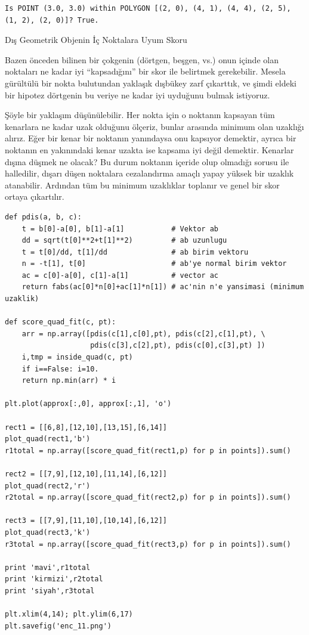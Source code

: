 \documentclass[12pt,fleqn]{article}\usepackage{../../common}
\begin{document}
\begin{verbatim}
Is POINT (3.0, 3.0) within POLYGON [(2, 0), (4, 1), (4, 4), (2, 5), (1, 2), (2, 0)]? True.
\end{verbatim}

Dış Geometrik Objenin İç Noktalara Uyum Skoru

Bazen önceden bilinen bir çokgenin (dörtgen, beşgen, vs.) onun içinde olan
noktaları ne kadar iyi ``kapsadığını'' bir skor ile belirtmek
gerekebilir. Mesela gürültülü bir nokta bulutundan yaklaşık dışbükey zarf
çıkarttık, ve şimdi eldeki bir hipotez dörtgenin bu veriye ne kadar iyi
uyduğunu bulmak istiyoruz. 

Şöyle bir yaklaşım düşünülebilir. Her nokta için o noktanın kapsayan tüm
kenarlara ne kadar uzak olduğunu ölçeriz, bunlar arasında minimum olan
uzaklığı alırız. Eğer bir kenar bir noktanın yanındaysa onu kapsıyor
demektir, ayrıca bir noktanın en yakınındaki kenar uzakta ise kapsama iyi
değil demektir. Kenarlar dışına düşmek ne olacak? Bu durum noktanın içeride
olup olmadığı sorusu ile halledilir, dışarı düşen noktalara cezalandırma
amaçlı yapay yüksek bir uzaklık atanabilir. Ardından tüm bu minimum
uzaklıklar toplanır ve genel bir skor ortaya çıkartılır.

\begin{verbatim}
def pdis(a, b, c):
    t = b[0]-a[0], b[1]-a[1]           # Vektor ab
    dd = sqrt(t[0]**2+t[1]**2)         # ab uzunlugu
    t = t[0]/dd, t[1]/dd               # ab birim vektoru
    n = -t[1], t[0]                    # ab'ye normal birim vektor
    ac = c[0]-a[0], c[1]-a[1]          # vector ac
    return fabs(ac[0]*n[0]+ac[1]*n[1]) # ac'nin n'e yansimasi (minimum uzaklik)

def score_quad_fit(c, pt):
    arr = np.array([pdis(c[1],c[0],pt), pdis(c[2],c[1],pt), \
                    pdis(c[3],c[2],pt), pdis(c[0],c[3],pt) ])
    i,tmp = inside_quad(c, pt)
    if i==False: i=10.
    return np.min(arr) * i

plt.plot(approx[:,0], approx[:,1], 'o')

rect1 = [[6,8],[12,10],[13,15],[6,14]]
plot_quad(rect1,'b')
r1total = np.array([score_quad_fit(rect1,p) for p in points]).sum()

rect2 = [[7,9],[12,10],[11,14],[6,12]]
plot_quad(rect2,'r')
r2total = np.array([score_quad_fit(rect2,p) for p in points]).sum()

rect3 = [[7,9],[11,10],[10,14],[6,12]]
plot_quad(rect3,'k')
r3total = np.array([score_quad_fit(rect3,p) for p in points]).sum()

print 'mavi',r1total
print 'kirmizi',r2total
print 'siyah',r3total

plt.xlim(4,14); plt.ylim(6,17)
plt.savefig('enc_11.png')
\end{verbatim}
\end{document}
